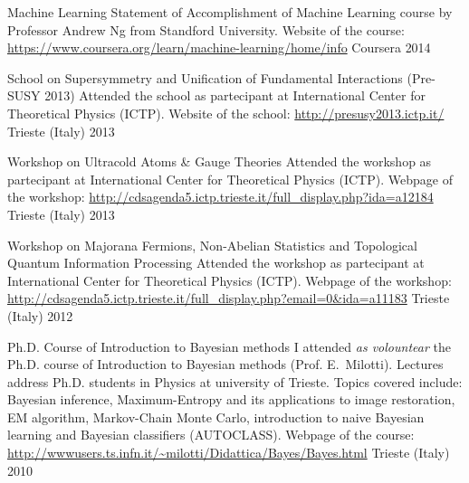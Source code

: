 


\begin{cvhonors}
  \cvhonor
{Machine Learning}
{Statement of Accomplishment of Machine Learning course by Professor Andrew Ng
   from Standford University.
   Website of the course:
   \url{https://www.coursera.org/learn/machine-learning/home/info}}
{Coursera}
{2014}

\end{cvhonors}


\begin{cvhonors}
  \cvhonor
{School on Supersymmetry and Unification of Fundamental Interactions (Pre-SUSY 2013)}
{Attended the school as partecipant at International Center for Theoretical
   Physics (ICTP). Website of the school: \url{http://presusy2013.ictp.it/}}
{Trieste (Italy)}
{2013}

  \cvhonor
{Workshop on Ultracold Atoms \& Gauge Theories}
{Attended the workshop as partecipant at International Center for Theoretical
   Physics (ICTP).  Webpage of the workshop:
   \url{http://cdsagenda5.ictp.trieste.it/full_display.php?ida=a12184}}
{Trieste (Italy)}
{2013}

  \cvhonor
{Workshop on Majorana Fermions, Non-Abelian Statistics and Topological Quantum Information Processing}%
{Attended the workshop as partecipant at International Center for Theoretical
   Physics (ICTP). 
   Webpage of the workshop:
   \url{http://cdsagenda5.ictp.trieste.it/full_display.php?email=0&ida=a11183}}
{Trieste (Italy)}
{2012}

  \cvhonor
{Ph.D. Course of Introduction to Bayesian methods}
{I attended \emph{as volountear} the Ph.D. course of Introduction to Bayesian methods (Prof.
   E.~Milotti).
   Lectures address Ph.D. students in Physics at university of Trieste.
Topics covered include: Bayesian inference, Maximum-Entropy and its applications
to image restoration, EM algorithm, Markov-Chain Monte Carlo, introduction to
naive Bayesian learning and 
Bayesian classifiers (AUTOCLASS). 
Webpage of the course:
\url{http://wwwusers.ts.infn.it/~milotti/Didattica/Bayes/Bayes.html}
}
{Trieste (Italy)}
{2010}%





 \end{cvhonors}









